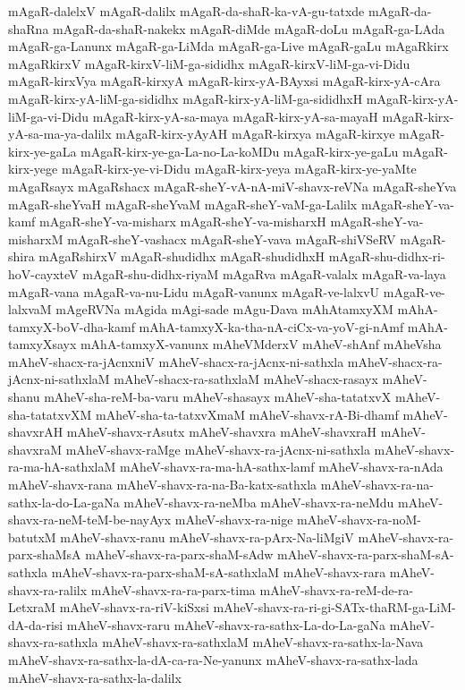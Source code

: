 {mAgaR-dalelxV
mAgaR-dalilx
mAgaR-da-shaR-ka-vA-gu-tatxde
mAgaR-da-shaRna
mAgaR-da-shaR-nakekx
mAgaR-diMde
mAgaR-doLu
mAgaR-ga-LAda
mAgaR-ga-Lanunx
mAgaR-ga-LiMda
mAgaR-ga-Live
mAgaR-gaLu
mAgaRkirx
mAgaRkirxV
mAgaR-kirxV-liM-ga-sididhx
mAgaR-kirxV-liM-ga-vi-Didu
mAgaR-kirxVya
mAgaR-kirxyA
mAgaR-kirx-yA-BAyxsi
mAgaR-kirx-yA-cAra
mAgaR-kirx-yA-liM-ga-sididhx
mAgaR-kirx-yA-liM-ga-sididhxH
mAgaR-kirx-yA-liM-ga-vi-Didu
mAgaR-kirx-yA-sa-maya
mAgaR-kirx-yA-sa-mayaH
mAgaR-kirx-yA-sa-ma-ya-dalilx
mAgaR-kirx-yAyAH
mAgaR-kirxya
mAgaR-kirxye
mAgaR-kirx-ye-gaLa
mAgaR-kirx-ye-ga-La-no-La-koMDu
mAgaR-kirx-ye-gaLu
mAgaR-kirx-yege
mAgaR-kirx-ye-vi-Didu
mAgaR-kirx-yeya
mAgaR-kirx-ye-yaMte
mAgaRsayx
mAgaRshacx
mAgaR-sheY-vA-nA-miV-shavx-reVNa
mAgaR-sheYva
mAgaR-sheYvaH
mAgaR-sheYvaM
mAgaR-sheY-vaM-ga-Lalilx
mAgaR-sheY-va-kamf
mAgaR-sheY-va-misharx
mAgaR-sheY-va-misharxH
mAgaR-sheY-va-misharxM
mAgaR-sheY-vashacx
mAgaR-sheY-vava
mAgaR-shiVSeRV
mAgaR-shira
mAgaRshirxV
mAgaR-shudidhx
mAgaR-shudidhxH
mAgaR-shu-didhx-ri-hoV-cayxteV
mAgaR-shu-didhx-riyaM
mAgaRva
mAgaR-valalx
mAgaR-va-laya
mAgaR-vana
mAgaR-va-nu-Lidu
mAgaR-vanunx
mAgaR-ve-lalxvU
mAgaR-ve-lalxvaM
mAgeRVNa
mAgida
mAgi-sade
mAgu-Dava
mAhAtamxyXM
mAhA-tamxyX-boV-dha-kamf
mAhA-tamxyX-ka-tha-nA-ciCx-va-yoV-gi-nAmf
mAhA-tamxyXsayx
mAhA-tamxyX-vanunx
mAheVMderxV
mAheV-shAnf
mAheVsha
mAheV-shacx-ra-jAcnxniV
mAheV-shacx-ra-jAcnx-ni-sathxla
mAheV-shacx-ra-jAcnx-ni-sathxlaM
mAheV-shacx-ra-sathxlaM
mAheV-shacx-rasayx
mAheV-shanu
mAheV-sha-reM-ba-varu
mAheV-shasayx
mAheV-sha-tatatxvX
mAheV-sha-tatatxvXM
mAheV-sha-ta-tatxvXmaM
mAheV-shavx-rA-Bi-dhamf
mAheV-shavxrAH
mAheV-shavx-rAsutx
mAheV-shavxra
mAheV-shavxraH
mAheV-shavxraM
mAheV-shavx-raMge
mAheV-shavx-ra-jAcnx-ni-sathxla
mAheV-shavx-ra-ma-hA-sathxlaM
mAheV-shavx-ra-ma-hA-sathx-lamf
mAheV-shavx-ra-nAda
mAheV-shavx-rana
mAheV-shavx-ra-na-Ba-katx-sathxla
mAheV-shavx-ra-na-sathx-la-do-La-gaNa
mAheV-shavx-ra-neMba
mAheV-shavx-ra-neMdu
mAheV-shavx-ra-neM-teM-be-nayAyx
mAheV-shavx-ra-nige
mAheV-shavx-ra-noM-batutxM
mAheV-shavx-ranu
mAheV-shavx-ra-pArx-Na-liMgiV
mAheV-shavx-ra-parx-shaMsA
mAheV-shavx-ra-parx-shaM-sAdw
mAheV-shavx-ra-parx-shaM-sA-sathxla
mAheV-shavx-ra-parx-shaM-sA-sathxlaM
mAheV-shavx-rara
mAheV-shavx-ra-ralilx
mAheV-shavx-ra-ra-parx-tima
mAheV-shavx-ra-reM-de-ra-LetxraM
mAheV-shavx-ra-riV-kiSxsi
mAheV-shavx-ra-ri-gi-SATx-thaRM-ga-LiM-dA-da-risi
mAheV-shavx-raru
mAheV-shavx-ra-sathx-La-do-La-gaNa
mAheV-shavx-ra-sathxla
mAheV-shavx-ra-sathxlaM
mAheV-shavx-ra-sathx-la-Nava
mAheV-shavx-ra-sathx-la-dA-ca-ra-Ne-yanunx
mAheV-shavx-ra-sathx-lada
mAheV-shavx-ra-sathx-la-dalilx
}
